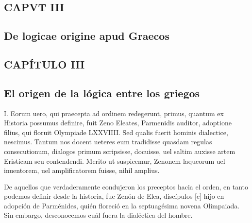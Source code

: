 \documentclass{article}
\begin{document}
\begin{paracol}{2} %
  \begin{nthcolumn*}{0} %
    \subsection*{\centering CAPVT III}
    \subsection*{\centering De logicae origine apud Graecos} 
  \end{nthcolumn*}
  \vspace{0.5cm}
  \begin{nthcolumn}{1} %
    \subsection*{\centering CAPÍTULO III}
    \subsection*{\centering El origen de la lógica entre los griegos} 
  \end{nthcolumn}
\vspace{0.5cm}
\begin{nthcolumn*}{0} %
    I. Eorum uero, qui praecepta ad ordinem redegerunt, primus, quantum ex Historia possumus definire, fuit Zeno Eleates, Parmenidis auditor, adoptione filius, qui floruit Olympiade LXXVIIII. Sed qualis fuerit hominis dialectice, nescimus. Tantum nos docent ueteres eum tradidisse quasdam regulas consecutionum, dialogos primum scripsisse, docuisse, uel saltim auxisse artem Eristicam seu contendendi. Merito ut suspicemur, Zenonem laqueorum uel inuentorem, uel amplificatorem fuisse, nihil amplius.    
  \end{nthcolumn*}
  \vspace{0.5cm}
  \begin{nthcolumn}{1} %
    De aquellos que verdaderamente condujeron los preceptos hacia el orden, en tanto podemos definir desde la  historia, fue Zenón de Elea, discípulos [e] hijo en adopción de Parménides, quién floreció en la septuagésima novena Olimpaiada. Sin embargo, desconocemos cuál fuera la dialéctica del hombre. 
  \end{nthcolumn}
  \vspace{0.5cm}
\end{paracol}
\end{document}
